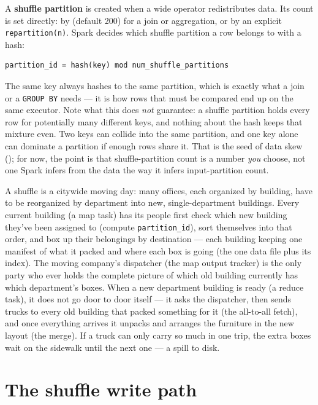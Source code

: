 A \textbf{shuffle partition} is created when a wide operator redistributes data.
Its count is set directly: by  (default 200)
for a join or aggregation, or by an explicit \texttt{repartition(n)}. Spark
decides which shuffle partition a row belongs to with a hash:

\begin{lstlisting}[language=text,numbers=none]
partition_id = hash(key) mod num_shuffle_partitions
\end{lstlisting}

The same key always hashes to the same partition, which is exactly what a join
or a \texttt{GROUP BY} needs --- it is how rows that must be compared end up on
the same executor. Note what this does \emph{not} guarantee: a shuffle partition
holds every row for potentially many different keys, and nothing about the hash
keeps that mixture even. Two keys can collide into the same partition, and one
key alone can dominate a partition if enough rows share it. That is the seed of
data skew (); for now, the point is that shuffle-partition count is
a number \emph{you} choose, not one Spark infers from the data the way it infers
input-partition count.

\begin{analogy}
A shuffle is a citywide moving day: many offices, each organized by building,
have to be reorganized by department into new, single-department buildings.
Every current building (a map task) has its people first check which new
building they've been assigned to (compute \texttt{partition\_id}), sort
themselves into that order, and box up their belongings by destination ---
each building keeping one manifest of what it packed and where each box is
going (the one data file plus its index). The moving company's dispatcher (the
map output tracker) is the only party who ever holds the complete picture of
which old building currently has which department's boxes. When a new
department building is ready (a reduce task), it does not go door to door
itself --- it asks the dispatcher, then sends trucks to every old building that
packed something for it (the all-to-all fetch), and once everything arrives it
unpacks and arranges the furniture in the new layout (the merge). If a truck
can only carry so much in one trip, the extra boxes wait on the sidewalk until
the next one --- a spill to disk.
\end{analogy}

\section{The shuffle write path}
\label{sec:shuffle-write}

